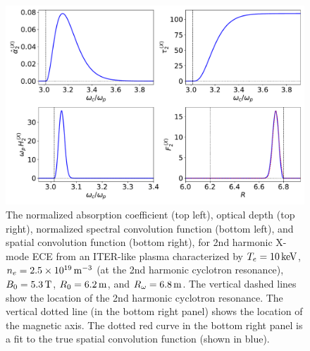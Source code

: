 \documentclass{iopjournal}
\begin{document}
\begin{figure}
\centerline{\includegraphics[width=\textwidth]{Fig22.pdf}}
\caption{The normalized  absorption coefficient (top left), optical depth (top right), normalized
spectral convolution function (bottom left), and spatial convolution function (bottom right), for 2nd  harmonic X-mode ECE from an 
ITER-like plasma characterized by  $T_e=10\,{\rm keV}$, $n_e=2.5\times  10^{19}\,{\rm m}^{-3}$ (at the 2nd harmonic cyclotron resonance), $B_0=5.3\,{\rm T}$, $R_0=6.2\,{\rm m}$, and $R_\omega= 6.8\,{\rm m}$.
The vertical dashed lines show the location of the 2nd harmonic cyclotron resonance.  The vertical dotted line (in the bottom right panel) shows the location of the  magnetic axis.
The dotted red curve in the bottom right panel is a  fit to the true spatial convolution function (shown in blue).
\label{Xmode}}
\end{figure}
\end{document}
